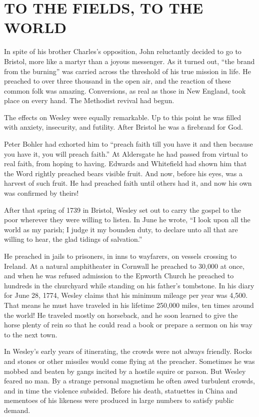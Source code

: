 \section{TO THE FIELDS, TO THE WORLD}

In spite of his brother Charles’s opposition, John reluctantly decided to go to Bristol, more like a
martyr than a joyous messenger. As it turned out, “the brand from the burning” was carried across
the threshold of his true mission in life. He preached to over three thousand in the open air, and
the reaction of these common folk was amazing. Conversions, as real as those in New England, took
place on every hand. The Methodist revival had begun.

The effects on Wesley were equally remarkable. Up to this point he was filled with anxiety,
insecurity, and futility. After Bristol he was a firebrand for God.

Peter Bohler had exhorted him to “preach faith till you have it and then because you have it, you
will preach faith.” At Aldersgate he had passed from virtual to real faith, from hoping to having.
Edwards and Whitefield had shown him that the Word rightly preached bears visible fruit. And now,
before his eyes, was a harvest of such fruit. He had preached faith until others had it, and now his
own was confirmed by theirs!

After that spring of 1739 in Bristol, Wesley set out to carry the gospel to the poor wherever they
were willing to listen. In June he wrote, “I look upon all the world as my parish; I judge it my
bounden duty, to declare unto all that are willing to hear, the glad tidings of salvation.”

He preached in jails to prisoners, in inns to wayfarers, on vessels crossing to Ireland. At a
natural amphitheater in Cornwall he preached to 30,000 at once, and when he was refused admission to
the Epworth Church he preached to hundreds in the churchyard while standing on his father’s
tombstone. In his diary for June 28, 1774, Wesley claims that his minimum mileage per year was
4,500. That means he must have traveled in his lifetime 250,000 miles, ten times around the world!
He traveled mostly on horseback, and he soon learned to give the horse plenty of rein so that he
could read a book or prepare a sermon on his way to the next town.

In Wesley’s early years of itinerating, the crowds were not always friendly. Rocks and stones or
other missiles would come flying at the preacher. Sometimes he was mobbed and beaten by gangs
incited by a hostile squire or parson. But Wesley feared no man. By a strange personal magnetism he
often awed turbulent crowds, and in time the violence subsided. Before his death, statuettes in
China and mementoes of his likeness were produced in large numbers to satisfy public demand.

